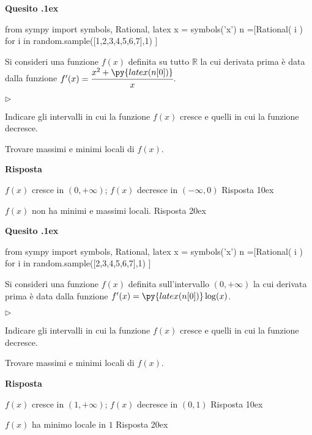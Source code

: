 \documentclass[11pt,twoside,a4paper]{article}
\newcommand{\mylabel}[1]{#1\hfill}
\renewenvironment{itemize}
  {\begin{list}{$\triangleright$}{%
   \setlength{\parskip}{0mm}
   \setlength{\topsep}{.4\baselineskip}
   \setlength{\rightmargin}{0mm}
   \setlength{\listparindent}{0mm}
   \setlength{\itemindent}{0mm}
   \setlength{\labelwidth}{2ex}
   \setlength{\itemsep}{.4\baselineskip}
   \setlength{\parsep}{0mm}
   \setlength{\partopsep}{0mm}
   \setlength{\labelsep}{1ex}
   \setlength{\leftmargin}{\labelwidth+\labelsep}
   \let\makelabel\mylabel}}{%
   \end{list}\vspace*{-1.3mm}}
\newcounter{quesito}
\newenvironment{question}{\bigskip\addtocounter{quesito}{1}\bigskip\bigskip\par\textbf{Quesito \thequesito.\kern1ex}}{\vspace{\parskip}}
\newenvironment{answer}{\par\textbf{Risposta\quad}}{\vspace{\parskip}}
\begin{document}
\begin{question}
\def\RR{{\mathds R}}
\begin{pycode}
from sympy import symbols, Rational, latex
x = symbols('x')
n =[Rational( i ) for i in random.sample([1,2,3,4,5,6,7],1) ]
\end{pycode}
Si consideri una funzione $f(x)$ definita su tutto $\RR$ la cui derivata prima è data dalla funzione $f'(x) = \cfrac{x^2 + \py{latex(n[0])}}{x}$.
\begin{itemize}
\item[1.] Indicare gli intervalli in cui la funzione $f(x)$ cresce e quelli in cui la funzione decresce.
\item[2.] Trovare massimi e minimi locali di $f(x)$.
\end{itemize}
\begin{answer}

{\color{blue}
$f(x)$ cresce in $(0, +\infty)$; $f(x)$ decresce in $(-\infty, 0)$ 
\hfill Risposta 1\kern0ex}

{\color{blue}
$f(x)$ non ha minimi e massimi locali.
\hfill Risposta 2\kern0ex}

\end{answer}
\end{question}
\begin{question}
\def\RR{{\mathds R}}
\begin{pycode}
from sympy import symbols, Rational, latex
x = symbols('x')
n =[Rational( i ) for i in random.sample([2,3,4,5,6,7],1) ]
\end{pycode}
Si consideri una funzione $f(x)$ definita sull'intervallo $(0, +\infty)$ la cui derivata prima è data dalla funzione $f'(x) = \py{latex(n[0])}\log (x)$.
\begin{itemize}
\item[1.] Indicare gli intervalli in cui la funzione $f(x)$ cresce e quelli in cui la funzione decresce.
\item[2.] Trovare massimi e minimi locali di $f(x)$.
\end{itemize}
\begin{answer}

{\color{blue}
$f(x)$ cresce in $(1, +\infty)$; $f(x)$ decresce in $(0, 1)$
\hfill Risposta 1\kern0ex}

{\color{blue}
$f(x)$ ha minimo locale in $1$
\hfill Risposta 2\kern0ex}

\end{answer}
\end{question}
\end{document}
